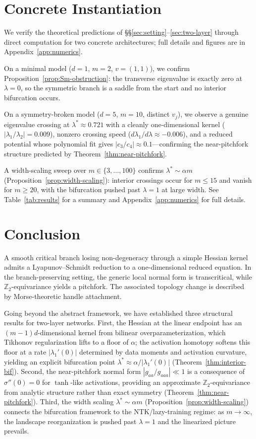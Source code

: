 \documentclass[11pt, reqno]{amsart}
\theoremstyle{plain}
\theoremstyle{definition}
\theoremstyle{remark}
\begin{document}
\section{Concrete Instantiation}\label{sec:numerics}

We verify the theoretical predictions of \S\S\ref{sec:setting}--\ref{sec:two-layer} through direct computation for two concrete architectures; full details and figures are in Appendix~\ref{app:numerics}.

On a minimal model ($d=1$, $m=2$, $v=(1,1)$), we confirm Proposition~\ref{prop:Sm-obstruction}: the transverse eigenvalue is exactly zero at $\lambda=0$, so the symmetric branch is a saddle from the start and no interior bifurcation occurs.

On a symmetry-broken model ($d=5$, $m=10$, distinct $v_j$), we observe a genuine eigenvalue crossing at $\lambda^*\approx 0.721$ with a cleanly one-dimensional kernel ($|\lambda_1/\lambda_2|=0.009$), nonzero crossing speed ($d\lambda_1/d\lambda\approx -0.006$), and a reduced potential whose polynomial fit gives $|c_3/c_4|\approx 0.1$---confirming the near-pitchfork structure predicted by Theorem~\ref{thm:near-pitchfork}.

A width-scaling sweep over $m\in\{3,\ldots,100\}$ confirms $\lambda^*\sim\alpha m$ (Proposition~\ref{prop:width-scaling}): interior crossings occur for $m\le 15$ and vanish for $m\ge 20$, with the bifurcation pushed past $\lambda=1$ at large width.  See Table~\ref{tab:results} for a summary and Appendix~\ref{app:numerics} for full details.

\section{Conclusion}

A smooth critical branch losing non-degeneracy through a simple Hessian kernel admits a Lyapunov--Schmidt reduction to a one-dimensional reduced equation. In the branch-preserving setting, the generic local normal form is transcritical, while $\mathbb Z_2$-equivariance yields a pitchfork. The associated topology change is described by Morse-theoretic handle attachment.

Going beyond the abstract framework, we have established three structural results for two-layer networks.  First, the Hessian at the linear endpoint has an $(m-1)d$-dimensional kernel from bilinear overparameterization, which Tikhonov regularization lifts to a floor of $\alpha$; the activation homotopy softens this floor at a rate $|\lambda_1'(0)|$ determined by data moments and activation curvature, yielding an explicit bifurcation point $\lambda^*\approx\alpha/|\lambda_1'(0)|$ (Theorem~\ref{thm:interior-bif}).  Second, the near-pitchfork normal form $|g_{aa}/g_{aaa}|\ll 1$ is a consequence of $\sigma''(0)=0$ for $\tanh$-like activations, providing an approximate $\mathbb Z_2$-equivariance from analytic structure rather than exact symmetry (Theorem~\ref{thm:near-pitchfork}).  Third, the width scaling $\lambda^*\sim\alpha m$ (Proposition~\ref{prop:width-scaling}) connects the bifurcation framework to the NTK/lazy-training regime: as $m\to\infty$, the landscape reorganization is pushed past $\lambda=1$ and the linearized picture prevails.
\end{document}
